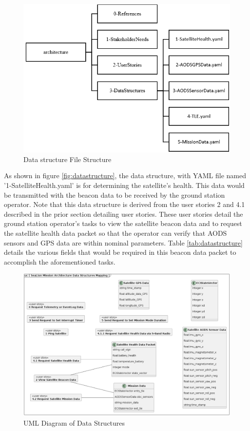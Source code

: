 \documentclass[journal,article,submit,pdftex,moreauthors]{Definitions/mdpi}
\begin{document}
\begin{figure}[H]
    \includegraphics[width=10.5 cm]{assets/datastructure_file.png}
    \caption{Data structure File Structure}
	\label{fig:datastructure_file}
    \end{figure}
	\noindent   
\unskip

As shown in figure \ref{fig:datastructure}, the data structure, with YAML file named '1-SatelliteHealth.yaml' is for determining the satellite's health.  This data would be transmitted with the beacon data to be received by the ground station operator.  Note that this data structure is derived from the user stories 2 and 4.1 described in the prior section detailing user stories.  These user stories detail the ground station operator's tasks to view the satellite beacon data and to request the satellite health data packet so that the operator can verify that AODS sensors and GPS data are within nominal parameters.  Table \ref{tab:datastructure} details the various fields that would be required in this beacon data packet to accomplish the aforementioned tasks.

\begin{figure}[H]
    \includegraphics[width=13.75 cm]{assets/uml_datastructure.png}
    \caption{UML Diagram of Data Structures}
	\label{fig:uml_datastructure}
    \end{figure}   
\unskip
\end{document}
